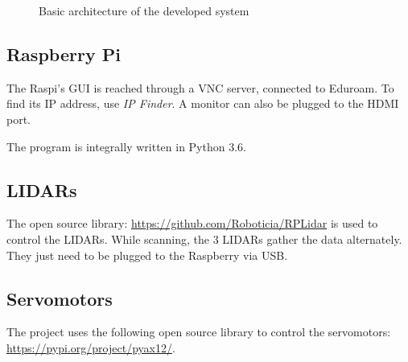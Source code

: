 \documentclass{article}
\newcommand{\vsp}{\vspace{\baselineskip}}
\begin{document}
\begin{figure}[H]
    \centering
    \caption{Basic architecture of the developed system}
    \label{fig:basic_architecture}
\end{figure}

\subsection{Raspberry Pi}

The Raspi's GUI is reached through a VNC server, connected to Eduroam. To find its IP address, use \textit{IP Finder}. A monitor can also be plugged to the HDMI port. 

\vsp

The program is integrally written in Python 3.6.

\subsection{LIDARs}

The open source library: \url{https://github.com/Roboticia/RPLidar} is used to control the LIDARs. While scanning, the 3 LIDARs gather the data alternately. They just need to be plugged to the Raspberry via USB.

\subsection{Servomotors}

The project uses the following open source library to control the servomotors: \url{https://pypi.org/project/pyax12/}. 
\end{document}
